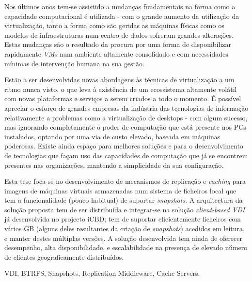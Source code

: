 
Nos últimos anos tem-se assistido a mudanças fundamentais na forma como a capacidade computacional é utilizada - com o grande aumento da utilização da virtualização, tanto a forma como são geridas as máquinas físicas como os modelos de infraestruturas num centro de dados sofreram grandes alterações. Estas mudanças são o resultado da procura por uma forma de disponibilizar rapidamente \textit{VMs} num ambiente altamente consolidado e com necessidades mínimas de intervenção humana na sua gestão.

Estão a ser desenvolvidas novas abordagens às técnicas de virtualização a um ritmo nunca visto, o que leva à existência de um ecossistema altamente volátil com novas plataformas e serviços a serem criados a todo o momento. É possível apreciar o esforço de grandes empresas da indústria das tecnologias de informação relativamente a problemas como a virtualização de desktops - com algum sucesso, mas ignorando completamente o poder de computação que está presente nos PCs instalados, optando por uma via de custo elevado, baseada em máquinas poderosas. Existe ainda espaço para melhores soluções e para o desenvolvimento de tecnologias que façam uso das capacidades de computação que já se encontrem presentes nas organizações, mantendo a simplicidade da sua configuração.

Esta tese foca-se no desenvolvimento de mecanismos de replicação e \textit{caching} para imagens de máquinas virtuais armazenadas num sistema de ficheiros local que tem a funcionalidade (pouco habitual) de suportar \textit{snapshots}. A arquitectura da solução proposta tem de ser distribuída e integrar-se na solução \textit{client-based VDI} já desenvolvida no projecto iCBD; tem de suportar eficientemente ficheiros com vários GB (alguns deles resultantes da criação de \textit{snapshots}) acedidos em leitura, e manter destes múltiplas versões. A solução desenvolvida tem ainda de oferecer desempenho, alta disponibilidade, e escalabilidade na presença de elevado número de clientes geograficamente distribuídos.



\begin{keywords}
	VDI, BTRFS, Snapshots, Replication Middleware, Cache Servers.
\end{keywords}
